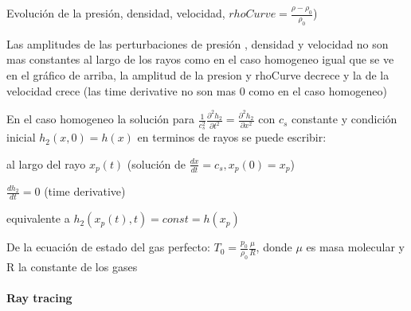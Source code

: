 \documentclass{article}
\begin{document}
\begin{description}

\item Evolución de la presión, densidad, velocidad, $rhoCurve = \frac{\rho- \rho_0}{\rho_0} $)

\item Las amplitudes de las perturbaciones de presión , densidad y velocidad  no son mas constantes al largo de los rayos como en el caso homogeneo igual que se ve en el gráfico de arriba, la amplitud de la presion y rhoCurve decrece y la de la velocidad crece (las time derivative  no son mas 0 como en el caso homogeneo)
\item En el caso homogeneo la solución para $\frac{1}{c_s^{2}} \frac{\partial^{2} h_2}{\partial t^{2}} = \frac{ \partial^{2} h_2}{\partial x^2}   $ con $c_s$ constante  y condición inicial $h_2(x,0) = h(x)$ en terminos de rayos se puede escribir:

\begin{description}
\item al largo del rayo $x_p(t)$ (solución de $\frac{dx}{dt} = c_s, x_p(0) = x_p$) 
\item $\frac{dh_2}{dt} = 0$ (time derivative)
\item equivalente a $h_2(x_p(t), t) = const = h(x_p)$  

\end{description}

\item De la ecuación de estado del gas perfecto: $T_0 = \frac{p_0} {\rho_0} \frac{\mu}{R}$, donde $\mu$ es masa molecular y R la constante de los gases
\end{description}

\newpage

\paragraph{Ray tracing}
\end{document}
